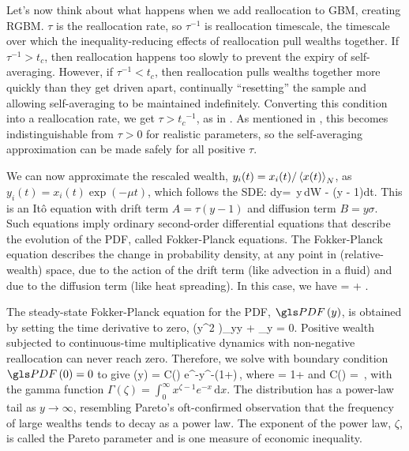 Let's now think about what happens when we add reallocation to GBM, creating RGBM. $\tau$ is the reallocation rate, so $\tau^{-1}$ is reallocation timescale, \ie the timescale over which the inequality-reducing effects of reallocation pull wealths together. If $\tau^{-1}>t_c$, then reallocation happens too slowly to prevent the expiry of self-averaging. However, if $\tau^{-1}<t_c$, then reallocation pulls wealths together more quickly than they get driven apart, continually ``resetting'' the sample and allowing self-averaging to be maintained indefinitely. Converting this condition into a reallocation rate, we get $\tau>{t_c}^{-1}$, as in . As mentioned in , this becomes indistinguishable from $\tau>0$ for realistic parameters, so the self-averaging approximation can be made safely for all positive $\tau$.

We can now approximate the rescaled wealth, $y_i(t)=x_i(t)/\left\langle x(t) \right\rangle_N$, as $y_i(t)=x_i(t)\exp(-\mu t)$, which follows the SDE: 
\be
dy= \sigma\,y\,dW - \tau\left(y - 1\right)dt.
\ee
This is an It\^o equation with drift term $A=\tau(y - 1)$ and diffusion term $B=y \sigma$. Such equations imply ordinary second-order differential equations that describe the evolution of the PDF, called Fokker-Planck equations. The Fokker-Planck equation describes the change in probability density, at any point in (relative-wealth) space, due to the action of the drift term (like advection in a fluid) and due to the diffusion term (like heat spreading). In this case, we have
\be
{}= + .
\ee

The steady-state Fokker-Planck equation for the PDF, $\PDF\left(y\right)$, is obtained by setting the time derivative to zero,
\be
{}\left(y^2 \PDF\right)_{yy} + \tau{}_y = 0.
\ee
Positive wealth subjected to continuous-time multiplicative dynamics with non-negative reallocation can never reach zero. Therefore, we solve  with boundary condition $\PDF\left(0\right)=0$ to give
\be
\PDF\left(y\right) = C\left(\zeta\right) e^{-}y^{-\left(1+\zeta\right)}\,,
\ee
where 
\be
\zeta = 1+
\ee
and
\be
C\left(\zeta\right) = \frac{\left(\zeta -1\right)^\zeta}{\Gamma \left(\zeta \right)}\,,
\ee
with the gamma function $\Gamma\left(\zeta\right) = \int_0^\infty x^{\zeta-1} e^{-x}\,\mathrm{d}x$. The distribution has a power-law tail as $y\to\infty$, resembling Pareto's oft-confirmed observation that the frequency of large wealths tends to decay as a power law. The exponent of the power law, $\zeta$, is called the Pareto parameter and is one measure of economic inequality.

